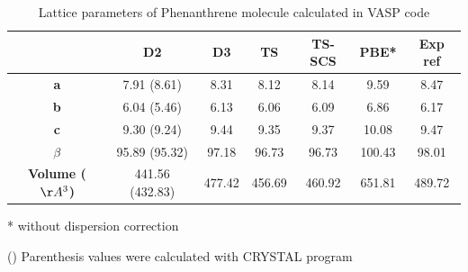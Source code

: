  		
 		\begin{table}[H]
 			\caption{Lattice parameters of Phenanthrene molecule calculated in VASP code} \label{table-phenan}
 			\begin{center}
 				\begin{threeparttable}
 					\begin{tabular}{c c c c c c c}
 						\toprule
 						& \textbf{D2} & \textbf{D3} & \textbf{TS} & \textbf{TS-SCS} & \textbf{PBE*} & \textbf{Exp} ref\cite{fabbiani2006exploration} \\
 						\midrule
 						\textbf{a} & 7.91 (8.61) & 8.31 & 8.12 & 8.14 & 9.59 & 8.47\\
 						\textbf{b}& 6.04 (5.46) & 6.13 & 6.06 & 6.09 & 6.86 & 6.17\\
 						\textbf{c}& 9.30 (9.24) & 9.44 & 9.35 & 9.37 & 10.08 & 9.47\\
 						\textbf{$\beta$} & 95.89 (95.32) & 97.18 & 96.73 & 96.73 & 100.43 & 98.01\\
 						\textbf{Volume ($\AA^{3}$)}& 441.56 (432.83) & 477.42 & 456.69 & 460.92 & 651.81 & 489.72\\
 						\bottomrule
 					\end{tabular}
 					
 					\begin{tablenotes}
 						\item[*] without dispersion correction
 						\item[()] Parenthesis values were calculated with CRYSTAL program
 					\end{tablenotes}
 				\end{threeparttable}
 			\end{center}
 		\end{table}
 	
